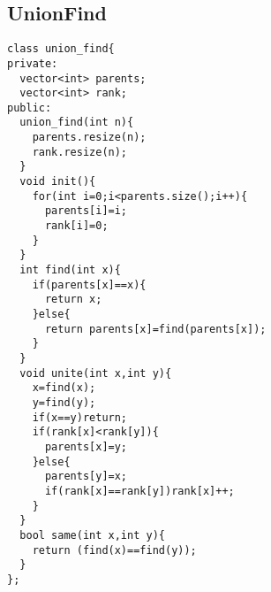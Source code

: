\documentclass{jsarticle}
\begin{document}
\begin{itemize}
\section{UnionFind}
\begin{lstlisting}
class union_find{
private:
  vector<int> parents;
  vector<int> rank;
public:
  union_find(int n){
    parents.resize(n);
    rank.resize(n);
  }
  void init(){
    for(int i=0;i<parents.size();i++){
      parents[i]=i;
      rank[i]=0;
    } 
  }
  int find(int x){
    if(parents[x]==x){
      return x;
    }else{
      return parents[x]=find(parents[x]);
    }
  }
  void unite(int x,int y){
    x=find(x);
    y=find(y);
    if(x==y)return;
    if(rank[x]<rank[y]){
      parents[x]=y;
    }else{
      parents[y]=x;
      if(rank[x]==rank[y])rank[x]++;
    }
  }
  bool same(int x,int y){
    return (find(x)==find(y));
  }
};
\end{lstlisting}


  \end{itemize}
\clearpage
\end{document}
